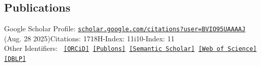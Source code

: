\documentclass[10pt,margin,line,pifont,palatino,courier]{res}
\begin{document}
\begin{resume}
%






%


\section{\sc Publications}
    Google Scholar Profile:
    \href{https://scholar.google.com/citations?user=BVIO95UAAAAJ}{\small\texttt{scholar.google.com/citations?user=BVIO95UAAAAJ}}\\
    \hspace*{9.7em}(Aug. 28 2025)\quad Citations: 1718\quad H-Index: 11\quad i10-Index: 11\\
    Other Identifiers:
    {\footnotesize\tt
    \href{https://orcid.org/0000-0003-3813-4875}{[ORCiD]}
    \href{https://publons.com/researcher/4930582/mo-zhou}{[Publons]}
    \href{https://www.semanticscholar.org/author/Mo-Zhou/2109097390}{[Semantic Scholar]}
    \href{https://www.webofscience.com/wos/author/record/AAC-2403-2022}{[Web of Science]}
    \href{https://dblp.org/pid/24/4846}{[DBLP]}
    }


\end{resume}
\end{document}
